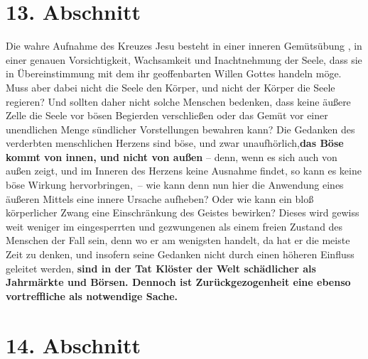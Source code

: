 \section{13. Abschnitt} \label{kap5_ab13}

Die wahre Aufnahme des Kreuzes Jesu besteht in einer inneren Gemütsübung
, in
einer genauen Vorsichtigkeit, Wachsamkeit und Inachtnehmung der Seele, dass sie
in Übereinstimmung mit dem ihr geoffenbarten Willen Gottes
 handeln möge. Muss
aber dabei nicht die Seele den Körper, und nicht der Körper die Seele regieren?
Und sollten daher nicht solche Menschen bedenken, dass keine äußere Zelle die
Seele vor bösen Begierden verschließen oder das Gemüt vor einer unendlichen
Menge sündlicher Vorstellungen bewahren kann? Die Gedanken des verderbten
menschlichen Herzens sind böse, und zwar unaufhörlich,\textbf{das Böse kommt von
innen,
und nicht von außen} -- denn, wenn es sich auch von außen zeigt, und im Inneren
des Herzens keine Ausnahme findet, so kann es keine böse Wirkung hervorbringen,~-- wie kann denn nun hier die Anwendung eines äußeren Mittels eine innere
Ursache
aufheben? Oder wie kann ein bloß körperlicher Zwang eine Einschränkung des
Geistes bewirken? Dieses wird gewiss weit weniger im eingesperrten und
gezwungenen als einem freien Zustand des Menschen der Fall sein, denn wo er am
wenigsten handelt, da hat er die meiste Zeit zu denken, und insofern seine
Gedanken nicht durch einen höheren Einfluss geleitet werden,
\label{ref:05_13_zurueckgezogenheit} \textbf{sind in der Tat
Klöster der Welt schädlicher als Jahrmärkte und Börsen. Dennoch ist
Zurückgezogenheit eine ebenso vortreffliche als notwendige Sache.}

\section{14. Abschnitt} \label{kap5_ab14}

